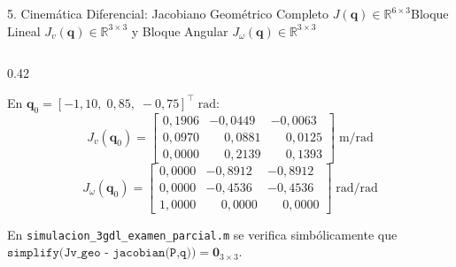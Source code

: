 \documentclass[aspectratio=169,10pt,xcolor=table]{beamer}
\newcommand{\Real}{\mathbb{R}}
\newcommand{\T}{^{\!\top}}
\begin{document}
\begin{frame}{5. Cinemática Diferencial: Jacobiano Geométrico Completo $J(\bm{q})\in\Real^{6\times 3}$}{Bloque Lineal $J_v(\bm{q})\in\Real^{3\times 3}$ y Bloque Angular $J_\omega(\bm{q})\in\Real^{3\times 3}$}
\begin{columns}[T,totalwidth=\textwidth]
  \begin{column}{0.42\textwidth}
    \begin{cajadef}
      \fontsize{6.6}{8.0}\selectfont
      En $\bm{q}_0=[-1{,}10,\;0{,}85,\;-0{,}75]\T\;\text{rad}$:
      \[
      J_v(\bm{q}_0) =
      \begin{bmatrix}
      0{,}1906 & -0{,}0449 & -0{,}0063\\
      0{,}0970 & \phantom{-}0{,}0881 & \phantom{-}0{,}0125\\
      0{,}0000 & \phantom{-}0{,}2139 & \phantom{-}0{,}1393
      \end{bmatrix}\;\text{m/rad}
      \]
      \[
      J_\omega(\bm{q}_0) =
      \begin{bmatrix}
      0{,}0000 & -0{,}8912 & -0{,}8912\\
      0{,}0000 & -0{,}4536 & -0{,}4536\\
      1{,}0000 & \phantom{-}0{,}0000 & \phantom{-}0{,}0000
      \end{bmatrix}\;\text{rad/rad}
      \]
    \end{cajadef}

    \vspace{0.8mm}
    \begin{cajaadv}
      \fontsize{6.5}{7.9}\selectfont
      En \texttt{simulacion\_3gdl\_examen\_parcial.m} se verifica simbólicamente que $\texttt{simplify(Jv\_geo - jacobian(P,q))} = \bm{0}_{3\times 3}$.
    \end{cajaadv}
  \end{column}
\end{columns}
\end{frame}
\end{document}
